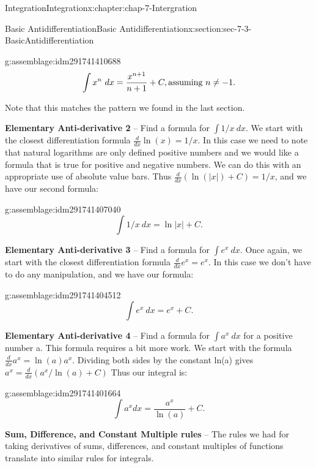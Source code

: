 \documentclass[oneside,10pt,]{book}
\newcommand{\terminology}[1]{\textbf{#1}}
\numberwithin{equation}{section}
\begin{document}
\begin{chapterptx}{Integration}{}{Integration}{}{}{x:chapter:chap-7-Intergration}
\begin{sectionptx}{Basic Antidifferentiation}{}{Basic Antidifferentiation}{}{}{x:section:sec-7-3-BasicAntidifferentiation}
\begin{assemblage}{}{g:assemblage:idm291741410688}%
%
\begin{equation*}
\int x^n\  dx=\frac{x^{n+1}}{n+1}+C, \hbox{assuming }n\ne -1.
\end{equation*}
%
\end{assemblage}
Note that this matches the pattern we found in the last section.%
\par
\terminology{Elementary Anti-derivative 2} – Find a formula for \(\int 1/x \ dx\). We start with the closest differentiation formula \(\frac{d}{dx}   \ln (x)=1/x\).  In this case we need to note that natural logarithms are only defined positive numbers and we would like a formula that is true for positive and negative numbers.  We can do this with an appropriate use of absolute value bars.  Thus \(\frac{d}{dx} (\ln(|x|)+C)=1/x\), and we have our second formula:%
\begin{assemblage}{}{g:assemblage:idm291741407040}%
%
\begin{equation*}
\int 1/x\  dx=\ln |x|+C.
\end{equation*}
%
\end{assemblage}
\terminology{Elementary Anti-derivative 3} – Find a formula for \(\int e^x\  dx\). Once again, we start with the closest differentiation formula \(\frac{d}{dx}  e^x=e^x\). In this case we don't have to do any manipulation, and we have our formula:%
\begin{assemblage}{}{g:assemblage:idm291741404512}%
%
\begin{equation*}
\int e^x \ dx=e^x+C.
\end{equation*}
%
\end{assemblage}
\terminology{Elementary Anti-derivative 4} – Find a formula for \(\int a^x\  dx\) for a positive number a. This formula requires a bit more work.  We start with the formula \(\frac{d}{dx}  a^x=\ln (a) a^x\).   Dividing both sides by the constant ln(a) gives \(a^x=\frac{d}{dx}  (a^x/\ln (a) +C)\)  Thus our integral is:%
\begin{assemblage}{}{g:assemblage:idm291741401664}%
%
\begin{equation*}
\int a^x  dx=\frac{a^x}{\ln (a)} +C.
\end{equation*}
%
\end{assemblage}
\terminology{Sum, Difference, and Constant Multiple rules} – The rules we had for taking derivatives of sums, differences, and constant multiples of functions translate into similar rules for integrals.%
\par

\end{sectionptx}
\end{chapterptx}
\end{document}
